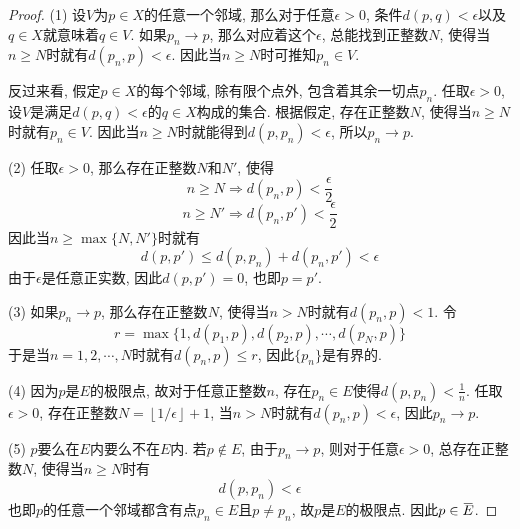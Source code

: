 \documentclass[cn,12pt,math=mtpro2,citestyle=gb7714-2015,bibstyle=gb7714-2015,twocol]{elegantbook}
\newcommand{\overbar}[1]{\mkern 1.5mu\overline{\mkern-1.5mu#1\mkern-1.5mu}\mkern 1.5mu}
\begin{document}
  \begin{proof}
    (1) 设$V$为$p\in X$的任意一个邻域, 那么对于任意$\epsilon>0$, 条件$d(p,q)<\epsilon$以及$q\in X$就意味着$q\in V$. 如果$p_n\rightarrow p$, 那么对应着这个$\epsilon$, 总能找到正整数$N$, 使得当$n\geq N$时就有$d(p_n,p)<\epsilon$. 因此当$n\geq N$时可推知$p_n\in V$.

    反过来看, 假定$p\in X$的每个邻域, 除有限个点外, 包含着其余一切点$p_n$. 任取$\epsilon>0$, 设$V$是满足$d(p,q)<\epsilon$的$q\in X$构成的集合. 根据假定, 存在正整数$N$, 使得当$n\geq N$时就有$p_n\in V$. 因此当$n\geq N$时就能得到$d(p,p_n)<\epsilon$, 所以$p_n\rightarrow p$.

    (2) 任取$\epsilon>0$, 那么存在正整数$N$和$N'$, 使得
    $$n\geq N\Rightarrow d(p_n,p)<\frac{\epsilon}{2}$$
    $$n\geq N'\Rightarrow d(p_n,p')<\frac{\epsilon}{2}$$
    因此当$n\geq \max\{N,N'\}$时就有
    $$d(p,p')\leq d(p,p_n)+d(p_n,p')<\epsilon$$
    由于$\epsilon$是任意正实数, 因此$d(p,p')=0$, 也即$p=p'$.

   (3) 如果$p_n\rightarrow p$, 那么存在正整数$N$, 使得当$n>N$时就有$d(p_n,p)<1$. 令
   $$r=\max\{1,d(p_1,p),d(p_2,p),\cdots,d(p_N,p)\}$$
   于是当$n=1,2,\cdots,N$时就有$d(p_n,p)\leq r$, 因此$\{p_n\}$是有界的.

   (4) 因为$p$是$E$的极限点, 故对于任意正整数$n$, 存在$p_n\in E$使得$\displaystyle d(p,p_n)<\frac{1}{n}$. 任取$\epsilon>0$, 存在正整数$N=\left\lfloor 1/\epsilon \right\rfloor+1$, 当$n>N$时就有$d(p_n,p)<\epsilon$, 因此$p_n\rightarrow p$.

   (5) $p$要么在$E$内要么不在$E$内. 若$p\notin E$, 由于$p_n\rightarrow p$, 则对于任意$\epsilon>0$, 总存在正整数$N$, 使得当$n\geq N$时有
   $$d(p,p_n)<\epsilon$$
   也即$p$的任意一个邻域都含有点$p_n\in E$且$p\neq p_n$, 故$p$是$E$的极限点. 因此$p\in \overbar{E}$.

  \end{proof}
\end{document}
